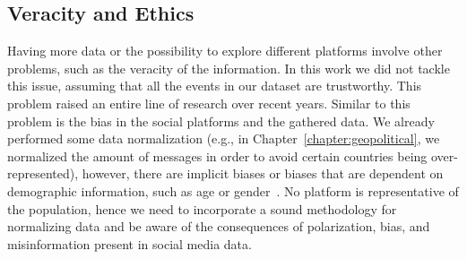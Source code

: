 \subsection*{Veracity and Ethics}
%
Having more data or the possibility to explore different platforms involve other
problems, such as the veracity of the information.
%
In this work we did not tackle this issue, assuming that all the events in our
dataset are trustworthy.
%
This problem raised an entire line of research over recent years.
%
Similar to this problem is the bias in the social platforms and the gathered
data.
%
We already performed some data normalization (e.g., in
Chapter~\ref{chapter:geopolitical}, we normalized the amount of messages in
order to avoid certain countries being over-represented), however, there are
implicit biases or biases that are dependent on demographic information, such as
age or gender~\cite{Graells-Garrido:2019:RAD:3292522.3326057}.
%
No platform is representative of the population, hence we need to incorporate a
sound methodology for normalizing data and be aware of the consequences of
polarization, bias, and misinformation present in social media data.